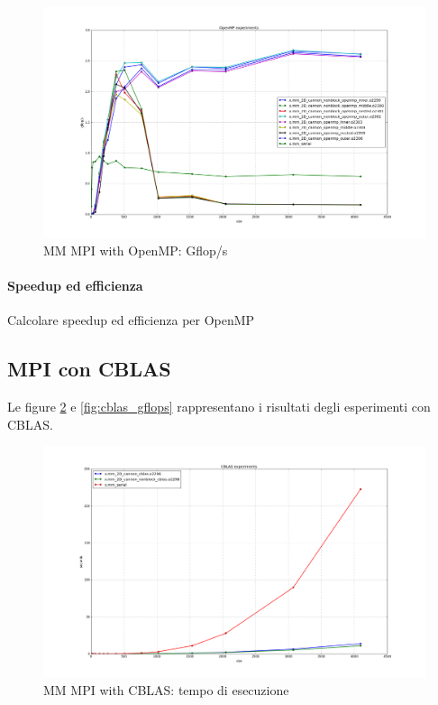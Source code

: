 \begin{figure}[htbp]
    \begin{center}
        \includegraphics[width=15cm]{immagini/openmp_gflops.png}
    \end{center}
    \caption{MM MPI with OpenMP: Gflop/s}
    \label{fig:openmp_gflops}
\end{figure}

\paragraph{Speedup ed efficienza}

Calcolare speedup ed efficienza per OpenMP

\subsection{MPI con CBLAS}

Le figure \ref{fig:cblas_times} e \ref{fig:cblas_gflops} rappresentano i risultati degli esperimenti con CBLAS.

\begin{figure}[htbp]
    \begin{center}
        \includegraphics[width=15cm]{immagini/cblas_times.png}
    \end{center}
    \caption{MM MPI with CBLAS: tempo di esecuzione}
    \label{fig:cblas_times}
\end{figure}

